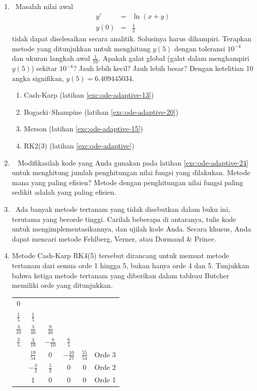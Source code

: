 \begin{enumerate}
\begin{lyxcode}
{[}y,x{]}=rk23(f,0,5,4,.0001,1000);

plot(x,y)
\end{lyxcode}
\item \octave\ \label{exc:ode-adaptive-24}Masalah nilai awal
\begin{eqnarray*}
y' & = & \ln(x+y)\\
y(0) & = & \frac{1}{2}
\end{eqnarray*}
tidak dapat diselesaikan secara analitik. Solusinya harus dihampiri.
Terapkan metode yang ditunjukkan untuk menghitung $y(5)$ dengan toleransi
$10^{-4}$ dan ukuran langkah awal $\frac{1}{10}$. Apakah galat global
(galat dalam menghampiri $y(5)$) sekitar $10^{-4}$? Jauh lebih kecil?
Jauh lebih besar? Dengan ketelitian 10 angka signifikan, $y(5)=6.409445034$. \hasananswer 

\begin{enumerate}
\item Cash-Karp (latihan \ref{exc:ode-adaptive-13})
\item Bogacki--Shampine (latihan \ref{exc:ode-adaptive-20})
\item \label{exc:ode-adaptive-31}Merson (latihan \ref{exc:ode-adaptive-15})
\item \label{exc:ode-adaptive-32}RK2(3) (latihan \ref{exc:ode-adaptive})
\end{enumerate}
\item \octave\ \label{exc:ode-adaptive-33} Modifikasilah kode yang Anda
gunakan pada latihan \ref{exc:ode-adaptive-24} untuk menghitung jumlah
penghitungan nilai fungsi yang dilakukan. Metode mana yang paling
efisien? Metode dengan penghitungan nilai fungsi paling sedikit adalah
yang paling efisien. \hasananswer 
\item \octave\ Ada banyak metode tertanam yang tidak disebutkan dalam buku
ini, terutama yang berorde tinggi. Carilah beberapa di antaranya,
tulis kode untuk mengimplementasikannya, dan ujilah kode Anda. Secara
khusus, Anda dapat mencari metode Fehlberg, Verner, atau Dormand \&
Prince.
\item Metode Cash-Karp RK4(5) tersebut \cite{cash}
dirancang untuk memuat metode tertanam dari semua orde 1 hingga 5,
bukan hanya orde 4 dan 5. Tunjukkan bahwa ketiga metode tertanam yang
diberikan dalam tableau Butcher memiliki orde yang ditunjukkan.

\begin{center}
\begin{tabular}{c|ccccc}
0 &  &  &  &  & \tabularnewline
$\frac{1}{5}$ & $\frac{1}{5}$ &  &  &  & \tabularnewline
$\frac{3}{10}$ & $\frac{3}{40}$ & $\frac{9}{40}$ &  &  & \tabularnewline
$\frac{3}{5}$ & $\frac{3}{10}$ & $-\frac{9}{10}$ & $\frac{6}{5}$ &  & \tabularnewline
\hline 
 & $\frac{19}{54}$ & $0$ & $-\frac{10}{27}$ & $\frac{55}{54}$ & Orde 3\tabularnewline
\hline 
 & $-\frac{3}{2}$ & $\frac{5}{2}$ & $0$ & $0$ & Orde 2\tabularnewline
\hline 
 & $1$ & $0$ & $0$ & $0$ & Orde 1\tabularnewline
\end{tabular}
\par\end{center}

\end{enumerate}
\noindent\finishexercises 

\noindent\renewcommand{\arraystretch}{1}
